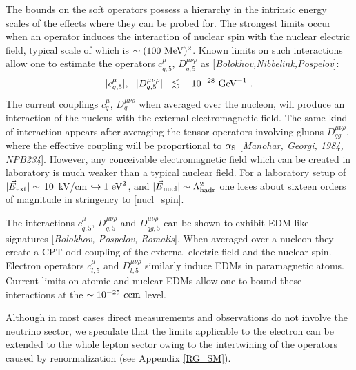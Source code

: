 \documentclass[12pt]{revtex4}
\begin{document}
	The bounds on the soft operators possess a hierarchy in the 
	intrinsic energy scales of the effects where they can be probed for.
	The strongest limits occur when an operator induces the interaction 
	of nuclear spin with the nuclear electric field, typical scale of which
	is $ \sim (100~{\rm MeV})^2 $.
	Known limits on such interactions allow one to estimate the operators 
$ c^\mu_{q,5} $, $ D^{\mu\nu\rho}_{q,5} $ as
	[{\it Bolokhov,Nibbelink,Pospelov}]:
\begin{equation}
\label{nucl_spin}
	|c^\mu_{q,5}|,~~ |D^{\mu\nu\rho}_{q,5}| ~~\lesssim~~~
	10^{-28}~{\rm GeV}^{-1}~.
\end{equation}
	The current couplings $ c_q^\mu $, $ D^{\mu\nu\rho}_q $  when averaged over the nucleon, 
	will produce an interaction of the nucleus with the external electromagnetic field.
	The same kind of interaction appears after averaging the tensor operators
	involving gluons $ D^{\mu\nu\rho}_{qg} $, where the effective coupling will be
	proportional to $ \alpha_{\rm S} $ [{\it Manohar, Georgi, 1984, NPB234}]. 
	However, any conceivable electromagnetic field which can be created in laboratory
	is much weaker than a typical nuclear field.
	For a laboratory setup of $ |\vec{E}{}_{\rm ext}| \sim $ 10~kV/cm 
	$ \hookrightarrow 1~{\rm eV}^2 $, and 
	$ |\vec{E}{}_{\rm nucl}| \sim \Lambda_{\rm hadr}^2 $
	one loses about sixteen orders of magnitude in stringency to \eqref{nucl_spin}.
	
	The interactions $ c^\mu_{q,5} $, $ D^{\mu\nu\rho}_{q,5} $ and
	$ D^{\mu\nu\rho}_{qg,5} $ can be shown to exhibit EDM-like signatures
	[{\it Bolokhov, Pospelov, Romalis}].
	When averaged over a nucleon they create a CPT-odd coupling of the external electric 
	field and the nuclear spin. 
	Electron operators $ c_{l,5}^\mu $ and $ D_{l,5}^{\mu\nu\rho} $ similarly induce
	EDMs in paramagnetic atoms. 
	Current limits on atomic and nuclear EDMs allow one to bound these interactions
	at the $ \sim 10^{-25}~e{\rm cm} $ 
	level.
	

	Although in most cases direct measurements and observations do not involve 
	the neutrino sector, 
	we speculate that the limits applicable to the electron can be extended to
	the whole lepton sector owing to the intertwining of the operators caused by
	renormalization (see Appendix \ref{RG_SM}).
\end{document}
